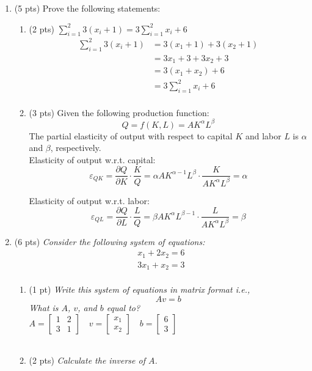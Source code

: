 \documentclass{./../../Latex/tests}
\begin{document}
\begin{enumerate}
\newpage
\item (5 pts) Prove the following statements:
\begin{enumerate}
\item (2 pts)  $ \sum_{i=1}^2 3 (x_i +1) = 3 \sum_{i=1}^2 x_i + 6 $ 
\begin{align*}
	\sum_{i=1}^2 3 (x_i +1) &= 3(x_1+1) + 3(x_2+1) \\
	& = 3x_1 + 3 + 3x_2 + 3 \\
	& = 3(x_1+x_2) + 6 \\
	& = 3 \sum_{i=1}^2 x_i + 6 \\
\end{align*}
\item (3 pts)  Given the following production function: 
$$ Q = f(K, L) = A K^{\alpha} L^{\beta} $$
The partial elasticity of output with respect to capital $K$ and labor $L$ is $\alpha$ and $\beta$, respectively. \\

Elasticity of output w.r.t. capital:
$$ \varepsilon_{QK} = \frac{\partial Q}{\partial K}\cdot \frac{K}{Q} = \alpha A K^{\alpha-1} L^{\beta}\cdot \frac{K}{A K^{\alpha} L^{\beta}} = \alpha $$

Elasticity of output w.r.t. labor:
$$ \varepsilon_{QL} = \frac{\partial Q}{\partial L}\cdot \frac{L}{Q} = \beta A K^{\alpha} L^{\beta-1}\cdot \frac{L}{A K^{\alpha} L^{\beta}} = \beta $$
\end{enumerate} 

\vspace{1cm}

\newpage
\item (6 pts) \textit{Consider the following system of equations:
}\begin{align*}
x_1 + 2 x_2 = 6 \\
3 x_1 + x_2 = 3 \\
\end{align*}
\begin{enumerate}
  \item (1 pt) \textit{Write this system of equations in matrix format i.e., $$ Av=b $$
  What is $A$, $v$, and $b$ equal to?} \\
  
  $A=\left[\begin{array}{rrr}1 & 2  \\ 3 & 1  \end{array}\right] \quad v=\left[\begin{array}{l}x_1 \\ x_2 \end{array}\right] \quad b=\left[\begin{array}{c}6 \\ 3 \end{array}\right]$ \\~\\
   \item (2 pts) \textit{Calculate the inverse of $A$. } \\
   

\end{enumerate}
\end{enumerate}
\end{document}
